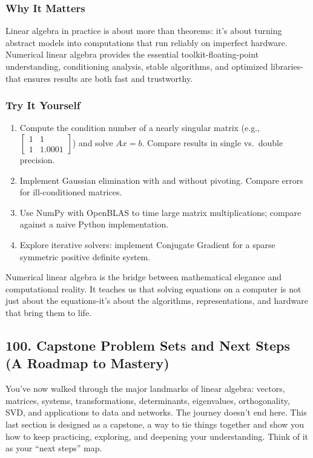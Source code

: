 \documentclass[
  letterpaper,
  DIV=11,
  numbers=noendperiod]{scrreprt}
\providecommand{\tightlist}{%
  \setlength{\itemsep}{0pt}\setlength{\parskip}{0pt}}
\begin{document}
\subsubsection{Why It Matters}\label{why-it-matters-94}

Linear algebra in practice is about more than theorems: it's about
turning abstract models into computations that run reliably on imperfect
hardware. Numerical linear algebra provides the essential
toolkit-floating-point understanding, conditioning analysis, stable
algorithms, and optimized libraries-that ensures results are both fast
and trustworthy.

\subsubsection{Try It Yourself}\label{try-it-yourself-98}

\begin{enumerate}
\def\labelenumi{\arabic{enumi}.}
\tightlist
\item
  Compute the condition number of a nearly singular matrix (e.g.,
  \(\begin{bmatrix} 1 & 1 \\ 1 & 1.0001 \end{bmatrix}\)) and solve
  \(Ax=b\). Compare results in single vs.~double precision.
\item
  Implement Gaussian elimination with and without pivoting. Compare
  errors for ill-conditioned matrices.
\item
  Use NumPy with OpenBLAS to time large matrix multiplications; compare
  against a naive Python implementation.
\item
  Explore iterative solvers: implement Conjugate Gradient for a sparse
  symmetric positive definite system.
\end{enumerate}

Numerical linear algebra is the bridge between mathematical elegance and
computational reality. It teaches us that solving equations on a
computer is not just about the equations-it's about the algorithms,
representations, and hardware that bring them to life.

\subsection{100. Capstone Problem Sets and Next Steps (A Roadmap to
Mastery)}\label{capstone-problem-sets-and-next-steps-a-roadmap-to-mastery}

You've now walked through the major landmarks of linear algebra:
vectors, matrices, systems, transformations, determinants, eigenvalues,
orthogonality, SVD, and applications to data and networks. The journey
doesn't end here. This last section is designed as a capstone, a way to
tie things together and show you how to keep practicing, exploring, and
deepening your understanding. Think of it as your ``next steps'' map.
\end{document}

